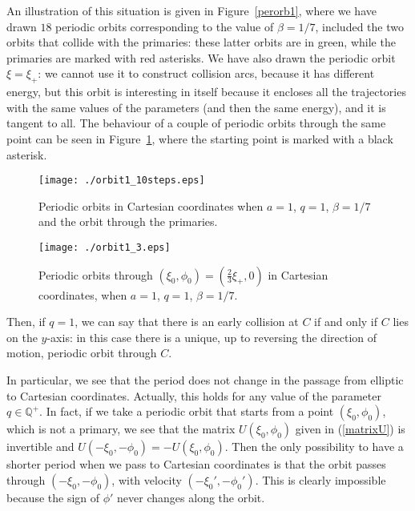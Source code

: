 \documentclass[a4paper]{article}
\begin{document}
An illustration of this situation is given in Figure~\ref{perorb1},
where we have drawn $18$ periodic orbits corresponding to the value of
$\beta=1/7$, included the two orbits that collide with the primaries:
these latter orbits are in green, while the primaries are marked with
red asterisks.  We have also drawn the periodic orbit $\xi=\xi_+$: we
cannot use it to construct collision arcs, because it has different
energy, but this orbit is interesting in itself because it encloses
all the trajectories with the same values of the parameters (and then
the same energy), and it is tangent to all.  The behaviour of a couple
of periodic orbits through the same point can be seen in
Figure~\ref{perorb2}, where the starting point is marked with a black
asterisk.
\begin{figure}[h]
\begin{minipage}[b]{0.49\textwidth} 
  \centering
   
   \texttt{[image: ./orbit1\_10steps.eps]}
   \caption{\small{Periodic orbits in Cartesian coordinates when $a=1$, $q=1$, 
     $\beta=1/7$ and the orbit through the primaries. }}
   \label{perorb1}
 \end{minipage}
 \hspace{2mm} 
 \begin{minipage}[b]{0.49\textwidth}
  \centering
   
  \texttt{[image: ./orbit1\_3.eps]}
   \caption{\small{Periodic orbits through
       $(\xi_0,\phi_0)=(\frac{2}{3} \xi_+,0)$ in Cartesian
       coordinates, when $a=1$, $q=1$, $\beta=1/7$.}}
   \label{perorb2}
 \end{minipage}
\end{figure}

Then, if $q=1$, we can say that there is an early collision at $C$ if and only
if $C$ lies on the $y$-axis: in this case there is a unique, up to reversing 
the direction of motion, periodic orbit through $C$.

In particular, we see that the period does not change in the passage
from elliptic to Cartesian coordinates.  Actually, this holds for any
value of the parameter $q \in {\mathbb{Q}}^+$.  In fact, if we take a periodic
orbit that starts from a point $(\xi_0,\phi_0)$, which is not a
primary, we see that the matrix $U(\xi_0,\phi_0)$ given in
(\ref{matrixU}) is invertible and
$U(-\xi_0,-\phi_0)=-U(\xi_0,\phi_0)$.  Then the only possibility to
have a shorter period when we pass to Cartesian coordinates is that
the orbit passes through $(-\xi_0,-\phi_0)$, with velocity
$(-\xi_0',-\phi_0')$.  This is clearly impossible because the sign of
$\phi'$ never changes along the orbit.
 
\end{document}
